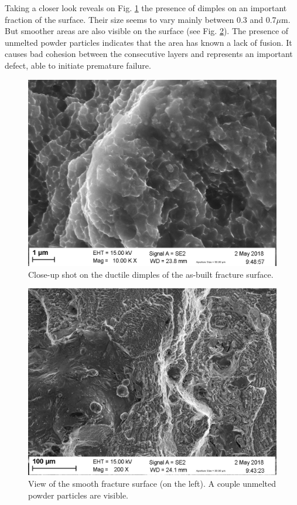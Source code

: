 Taking a closer look reveals on Fig. \ref{fig:ms_ab_frac3} the presence of dimples on an important fraction of the surface. Their size seems to vary mainly between 0.3 and 0.7$\mu$m. But smoother areas are also visible on the surface (see Fig. \ref{fig:ms_ab_frac4}). The presence of unmelted powder particles indicates that the area has known a lack of fusion. It causes bad cohesion between the consecutive layers and represents an important defect, able to initiate premature failure.\\

\begin{figure}[ht]
	\centering
	\centerline{\includegraphics[scale=0.35]{Images/frac-01-09.jpg}}
	\decoRule
	\caption[Close-up shot on the ductile dimples of the as-built fracture surface]{Close-up shot on the ductile dimples of the as-built fracture surface.}
	\label{fig:ms_ab_frac3}
\end{figure}

\begin{figure}[ht]
	\centering
	\centerline{\includegraphics[scale=0.35]{Images/frac-01-07.jpg}}
	\decoRule
	\caption[View of the smooth fracture surface (on the left). A couple unmelted powder particles are visible]{View of the smooth fracture surface (on the left). A couple unmelted powder particles are visible.}
	\label{fig:ms_ab_frac4}
\end{figure}

